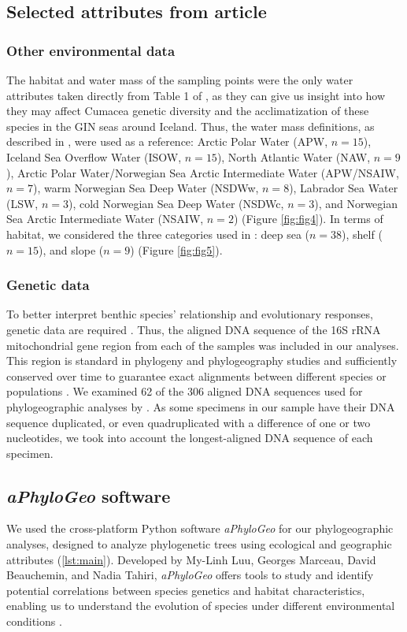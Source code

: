 \subsection{Selected attributes from article \cite{uhlir_adding_2021}} 
\subsubsection{Other environmental data} 
The habitat and water mass of the sampling points were the only water attributes taken directly from Table 1 of \citep{uhlir_adding_2021}, as they can give us insight into how they may affect Cumacea genetic diversity and the acclimatization of these species in the GIN seas around Iceland. Thus, the water mass definitions, as described in \citep{uhlir_adding_2021}, were used as a reference: Arctic Polar Water (APW, $n=15$), Iceland Sea Overflow Water (ISOW, $n=15$), North Atlantic Water (NAW, $n=9$), Arctic Polar Water/Norwegian Sea Arctic Intermediate Water (APW/NSAIW, $n=7$), warm Norwegian Sea Deep Water (NSDWw, $n=8$), Labrador Sea Water (LSW, $n=3$), cold Norwegian Sea Deep Water (NSDWc, $n=3$), and Norwegian Sea Arctic Intermediate Water (NSAIW, $n=2$) (Figure \ref{fig:fig4}). In terms of habitat, we considered the three categories used in \citep{uhlir_adding_2021}: deep sea ($n=38$), shelf ($n=15$), and slope ($n=9$) (Figure \ref{fig:fig5}).

\subsubsection{Genetic data} 
To better interpret benthic species' relationship and evolutionary responses, genetic data are required \citep{wilson_speciation_1987, uhlir_adding_2021}. Thus, the aligned DNA sequence of the 16S rRNA mitochondrial gene region from each of the samples was included in our analyses. This region is standard in phylogeny and phylogeography studies \citep{hugenholtz1998impact} and sufficiently conserved over time to guarantee exact alignments between different species or populations \citep{saccone1999evolutionary}. We examined 62 of the 306 aligned DNA sequences used for phylogeographic analyses by \citep{uhlir_adding_2021}. As some specimens in our sample have their DNA sequence duplicated, or even quadruplicated with a difference of one or two nucleotides, we took into account the longest-aligned DNA sequence of each specimen.

\subsection{{\textit{aPhyloGeo} software}\label{aPhyloGeo-software}}
We used the cross-platform Python software \textit{aPhyloGeo} for our phylogeographic analyses, designed to analyze phylogenetic trees using ecological and geographic attributes (\autoref{lst:main}). Developed by My-Linh Luu, Georges Marceau, David Beauchemin, and Nadia Tahiri, \textit{aPhyloGeo} offers tools to study and identify potential correlations between species genetics and habitat characteristics, enabling us to understand the evolution of species under different environmental conditions \citep{koshkarov_phylogeography_2022}. 

